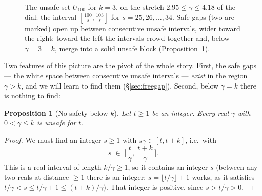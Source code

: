 \documentclass[11pt,reqno]{amsart}
\theoremstyle{plain}
\newtheorem{proposition}[theorem]{Proposition}
\theoremstyle{definition}
\theoremstyle{remark}
\begin{document}
\begin{figure}[t]
\centering
{}
\caption{The unsafe set $U_{100}$ for $k=3$, on the stretch $2.95 \le \gamma \le
4.18$ of the dial: the interval $[\frac{100}{s}, \frac{103}{s}]$ for
$s = 25, 26, \dots, 34$. Safe gaps (two are marked) open up between consecutive
unsafe intervals, wider toward the right; toward the left the intervals crowd
together and, below $\gamma = 3 = k$, merge into a solid unsafe block
(Proposition~\ref{prop:no-safety-below-k}).}
\label{fig:dial}
\end{figure}

Two features of this picture are the pivot of the whole story. First, the safe gaps
--- the white space between consecutive unsafe intervals --- \emph{exist} in the
region $\gamma > k$, and we will learn to find them (\S\ref{sec:freegap}). Second,
below $\gamma = k$ there is nothing to find:

\begin{proposition}[No safety below $k$]\label{prop:no-safety-below-k}
Let $t \ge 1$ be an integer. Every real $\gamma$ with $0 < \gamma \le k$ is unsafe
for $t$.
\end{proposition}

\begin{proof}
We must find an integer $s \ge 1$ with $s\gamma \in [t, t+k]$, i.e.\ with
\[
  s \;\in\; \Big[\, \frac{t}{\gamma},\ \frac{t+k}{\gamma} \,\Big] .
\]
This is a real interval of length $k/\gamma \ge 1$, so it contains an integer $s$
(between any two reals at distance $\ge 1$ there is an integer:
$s = \lfloor t/\gamma \rfloor + 1$ works, as it satisfies
$t/\gamma < s \le t/\gamma + 1 \le (t+k)/\gamma$). That integer is positive, since
$s > t/\gamma > 0$.
\end{proof}
\end{document}
